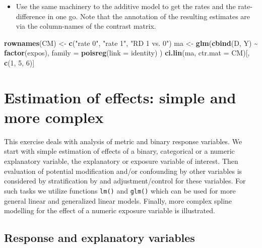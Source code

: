 \documentclass[
]{book}
\newenvironment{Shaded}{\begin{snugshade}}{\end{snugshade}}
\newcommand{\AttributeTok}[1]{\textcolor[rgb]{0.13,0.29,0.53}{#1}}
\newcommand{\DecValTok}[1]{\textcolor[rgb]{0.00,0.00,0.81}{#1}}
\newcommand{\FunctionTok}[1]{\textcolor[rgb]{0.13,0.29,0.53}{\textbf{#1}}}
\newcommand{\NormalTok}[1]{#1}
\newcommand{\OtherTok}[1]{\textcolor[rgb]{0.56,0.35,0.01}{#1}}
\newcommand{\SpecialCharTok}[1]{\textcolor[rgb]{0.81,0.36,0.00}{\textbf{#1}}}
\newcommand{\StringTok}[1]{\textcolor[rgb]{0.31,0.60,0.02}{#1}}
\providecommand{\tightlist}{%
  \setlength{\itemsep}{0pt}\setlength{\parskip}{0pt}}
\begin{document}
\begin{itemize}
\tightlist
\item
  Use the same machinery to the additive model to get the rates
  and the rate-difference in one go. Note that the annotation of the
  resulting estimates are via the column-names of the contrast matrix.
\end{itemize}

\begin{Shaded}
\begin{Highlighting}[]
\FunctionTok{rownames}\NormalTok{(CM) }\OtherTok{\textless{}{-}} \FunctionTok{c}\NormalTok{(}\StringTok{"rate 0"}\NormalTok{, }\StringTok{"rate 1"}\NormalTok{, }\StringTok{"RD 1 vs. 0"}\NormalTok{)}
\NormalTok{ma }\OtherTok{\textless{}{-}} \FunctionTok{glm}\NormalTok{(}\FunctionTok{cbind}\NormalTok{(D, Y) }\SpecialCharTok{\textasciitilde{}} \FunctionTok{factor}\NormalTok{(expos),}
  \AttributeTok{family =} \FunctionTok{poisreg}\NormalTok{(}\AttributeTok{link =}\NormalTok{ identity)}
\NormalTok{)}
\FunctionTok{ci.lin}\NormalTok{(ma, }\AttributeTok{ctr.mat =}\NormalTok{ CM)[, }\FunctionTok{c}\NormalTok{(}\DecValTok{1}\NormalTok{, }\DecValTok{5}\NormalTok{, }\DecValTok{6}\NormalTok{)]}
\end{Highlighting}
\end{Shaded}

\chapter{Estimation of effects: simple and more complex}\label{estimation-of-effects-simple-and-more-complex}

This exercise deals with analysis of metric and binary
response variables.
We start with simple estimation of effects of a binary, categorical or
a numeric explanatory variable, the explanatory or exposure variable of interest.
Then evaluation of potential modification and/or confounding by other variables
is considered by stratification by and adjustment/control for these variables.
For such tasks we utilize functions \texttt{lm()} and \texttt{glm()}
which can be used for more
general linear and generalized linear models. Finally, more complex
spline modelling for the effect of a numeric exposure variable is
illustrated.

\section{Response and explanatory variables}\label{response-and-explanatory-variables}
\end{document}
